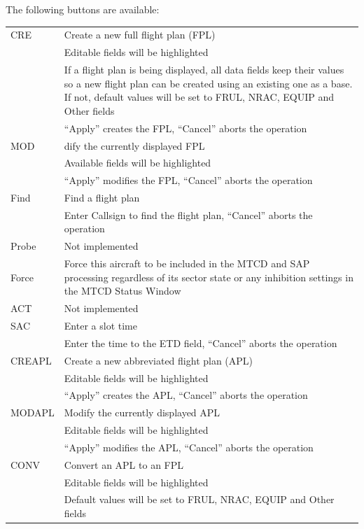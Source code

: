 \documentclass[11pt,a4paper]{memoir}
\begin{document}
The following buttons are available:

\begin{tabular}{l l}
    CRE         & Create a new full flight plan (FPL)\\
                & Editable fields will be highlighted\\
                & If a flight plan is being displayed, all data fields keep their values so a new flight plan can be created using an existing one as a base. If not, default values will be set to FRUL, NRAC, EQUIP and Other fields\\
                & “Apply” creates the FPL, “Cancel” aborts the operation\\
    MOD         & dify the currently displayed FPL\\
                & Available fields will be highlighted\\
                & “Apply” modifies the FPL, “Cancel” aborts the operation\\
    Find        & Find a flight plan\\
                & Enter Callsign to find the flight plan, “Cancel” aborts the operation\\
    Probe       & Not implemented\\
    Force       & Force this aircraft to be included in the MTCD and SAP processing regardless of its sector state or any inhibition settings in the MTCD Status Window\\
    ACT         & Not implemented\\
    SAC         & Enter a slot time\\
                & Enter the time to the ETD field, “Cancel” aborts the operation\\
    CREAPL      & Create a new abbreviated flight plan (APL)\\
                & Editable fields will be highlighted\\
                & “Apply” creates the APL, “Cancel” aborts the operation\\
    MODAPL      & Modify the currently displayed APL\\
                & Editable fields will be highlighted\\
                & “Apply” modifies the APL, “Cancel” aborts the operation\\
    CONV        & Convert an APL to an FPL\\
                & Editable fields will be highlighted\\
                & Default values will be set to FRUL, NRAC, EQUIP and Other fields\\

\end{tabular}
\end{document}
